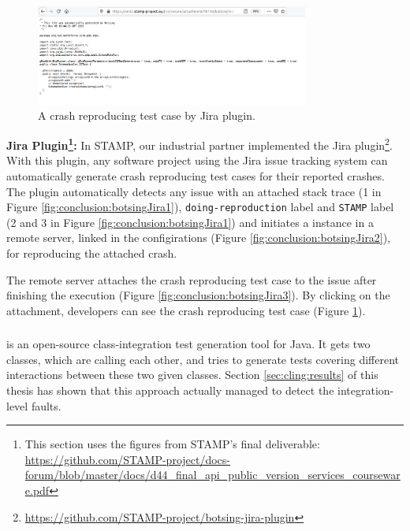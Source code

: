 \begin{figure}
    \includegraphics[width=0.8\textwidth]{conclusion/figures/deliverables_wp4_d44_images_jira-generated-test-case.png}
    \caption{A crash reproducing test case by \botsing Jira plugin.}
    \label{fig:conclusion:botsingJira4}
\end{figure}

\textbf{\botsing Jira Plugin\footnote{This section uses the figures from STAMP's final deliverable: \url{https://github.com/STAMP-project/docs-forum/blob/master/docs/d44_final_api_public_version_services_courseware.pdf}}:}
In STAMP, our industrial partner implemented the \botsing Jira plugin\footnote{\url{https://github.com/STAMP-project/botsing-jira-plugin}}.
With this plugin, any software project using the Jira issue tracking system can automatically generate crash reproducing test cases for their reported crashes. The plugin automatically detects any issue with an attached stack trace (1 in Figure \ref{fig:conclusion:botsingJira1}), \texttt{doing-reproduction} label and \texttt{STAMP} label (2 and 3 in Figure \ref{fig:conclusion:botsingJira1}) and initiates a \botsing instance in a remote server, linked in the configirations (Figure \ref{fig:conclusion:botsingJira2}), for reproducing the attached crash. 


The remote server attaches the crash reproducing test case to the issue after finishing the \botsing execution (Figure \ref{fig:conclusion:botsingJira3}). By clicking on the attachment, developers can see the crash reproducing test case (Figure \ref{fig:conclusion:botsingJira4}).



\subsubsection{\cling}

\cling is an open-source class-integration test generation tool for Java. It gets two classes, which are calling each other, and tries to generate tests covering different interactions between these two given classes. Section \ref{sec:cling:results} of this thesis has shown that this approach actually managed to detect the integration-level faults. 

